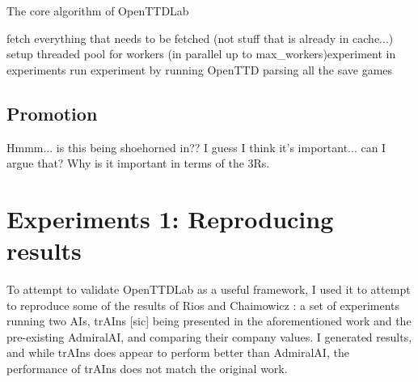 \documentclass[logo,msc,dsti]{style/infthesis}    %
\begin{document}
{\begin{algorithm}
\caption{The core algorithm of OpenTTDLab}\label{alg:openttd}
 fetch everything that needs to be fetched (not stuff that is already in cache...)\;
 setup threaded pool for workers\;
 \ForEach(in parallel up to {max\_workers}){experiment in experiments}{
  run experiment by running OpenTTD\;
  parsing all the save games\;
 }
\end{algorithm}


\section{Promotion}

Hmmm... is this being shoehorned in?? I guess I think it's important... can I argue that? Why is it important in terms of the 3Rs.





\chapter{Experiments 1: Reproducing results}
\label{chapter:experiments-attempt-at-reproducing}

To attempt to validate OpenTTDLab as a useful framework, I used it to attempt to reproduce some of the results of Rios and Chaimowicz \cite{rios2009trains}: a set of experiments running two AIs, trAIns [sic] being presented in the aforementioned work and the pre-existing AdmiralAI, and comparing their company values. I generated results, and while trAIns does appear to perform better than AdmiralAI, the performance of trAIns does not match the original work.

}
\end{document}
